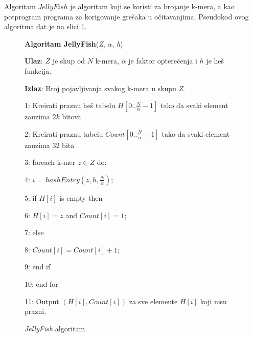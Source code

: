 \documentclass[12pt,oneside]{memoir}
\begin{document}
Algoritam $JellyFish$ je algoritam koji se koristi za brojanje k-mera, a kao potprogram programa za korigovanje grešaka u očitavanjima. Pseudokod ovog algoritma dat je na slici \ref{box:jellyfish}.

\begin{comment}

\begin{figure}[!ht]
  \centering
  \texttt{[image: Jellyfish.PNG]}
  \caption{Algoritam Jellyfish \cite{WingKinSung}}
  \label{fig:jellyfish}
\end{figure}

\end{comment}

\begin{figure}[!ht]
\begin{tcolorbox}
\textbf{Algoritam JellyFish}(\textit{Z}, $\alpha$, \textit{h})

\textbf{Ulaz}: $Z$ je skup od $N$ k-mera, $\alpha$ je faktor opterećenja i $h$ je heš funkcija.

\textbf{Izlaz}: Broj pojavljivanja svakog k-mera u skupu \textit{Z}.

1: Kreirati praznu heš tabelu $H[0..\frac{N}{\alpha} - 1]$ tako da svaki element zauzima $2k$ bitova

2: Kreirati praznu tabelu $Count[0..\frac{N}{\alpha} - 1]$ tako da svaki element zauzima 32 bita 

3: foreach k-mer $z \in Z$ do:

4:\hspace{1cm} $i$ = $hashEntry(z, h, \frac{N}{\alpha})$;
    
5:\hspace{1cm} if $H[i]$ is empty then

6:\hspace{2cm} $H[i] = z$ and $Count[i] = 1$;

7:\hspace{1cm} else 

8:\hspace{2cm} $Count[i] = Count[i] + 1$;

9:\hspace{1cm} end if

10: end for

11: Output $(H[i], Count[i])$ za sve elemente $H[i]$ koji nisu prazni.
\end{tcolorbox}
\caption{\textit{JellyFish} algoritam \cite{WingKinSung}}
\label{box:jellyfish}
\end{figure}
\end{document}
